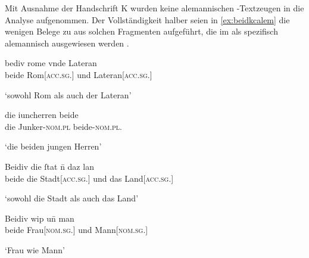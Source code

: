 Mit Ausnahme der Handschrift K wurden keine alemannischen
\KC{}-Textzeugen in die Analyse aufgenommen. Der Vollständigkeit halber
seien in \cref{ex:beidkcalem} die wenigen Belege zu  aus solchen
Fragmenten aufgeführt, die im \citet{hsc} als spezifisch alemannisch
ausgewiesen werden \autocite[vgl.][4, 44, 54]{wolf:kckat}.

\begin{exe}
\ex \label{ex:beidkcalem}
	\begin{xlist}
	\ex \gll bediv rome vnde Lateran \\ %
		     beide Rom[\textsc{acc.sg.\NeutI}] und
		     Lateran[\textsc{acc.sg.\MascI}] \\
		\begin{taggedline}{\parencites[\pno~2\vb, 17]{kc:a11}[vgl.][5953]{schroeder1895}}
		\trans `sowohl Rom als auch der Lateran'
		\end{taggedline}

	\ex \gll die iuncherren beide \\ %
		     die Junker-\textsc{nom.pl} beide-\textsc{nom.pl.\MascM} \\
		\begin{taggedline}{\parencites[\pno~1\vb, 14]{kc:a14}[vgl.][1417]{schroeder1895}}
		\trans `die beiden jungen Herren'
		\end{taggedline}

	\ex \gll Beidiv die ſtat n̄ daz lan \\ %
		     beide die Stadt[\textsc{acc.sg.\FemI}] und das
		     Land[\textsc{acc.sg.\NeutI}] \\
		\begin{taggedline}{\parencite[\pno~1\rb, 4]{kc:b1}}
		\trans `sowohl die Stadt als auch das Land'
		\end{taggedline}

	\ex \gll Beidiv wip un̄ man \\ %
		     beide Frau[\textsc{nom.sg.\NeutF}] und
		     Mann[\textsc{nom.sg.\MascM}] \\
		\begin{taggedline}{\parencites[\pno~2\rb, 29]{kc:b1}[vgl.][619]{schroeder1895}}
		\trans `Frau wie Mann'
		\end{taggedline}
\end{xlist}
\end{exe}
